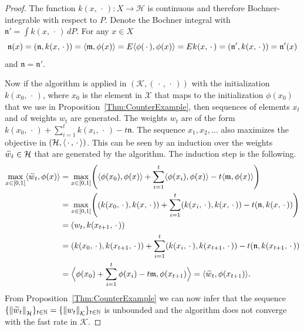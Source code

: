 \documentclass[10pt]{amsart}
\theoremstyle{definition}\newtheorem{defi}[theo]{Definition}\newtheorem{rema}[theo]{Remark}\newtheorem{exam}[theo]{Example}\newtheorem{exem}[theo]{Example}\newtheorem{nota}[theo]{Notation}
\theoremstyle{remark}
\newcommand{\bbN}{\mathbb{N}}
\newcommand{\E}{E}
\newcommand{\X}{\mathcal{X}}
\newcommand{\cH}{\mathcal{H}}
\newcommand{\clK}{\mathcal{K}}
\newcommand{\fkn}{\mathfrak{n}}
\newcommand{\mean}{\mathfrak{m}}
\providecommand{\norm}[1]{\left\lVert#1\right\rVert}
\providecommand{\inner}[2]{\left\langle #1,#2\right\rangle}
\let\oldtilde\tilde
\renewcommand*{\tilde}[1]{\mathchoice{\widetilde{#1}}{\widetilde{#1}}{\oldtilde{#1}}{\oldtilde{#1}}}
\let\originalleft\left
\let\originalright\right
\renewcommand{\left}{\mathopen{}\mathclose\bgroup\originalleft}
\renewcommand{\right}{\aftergroup\egroup\originalright}
\newcounter{setofstep}
\newcounter{step}[setofstep]
\begin{document}
\begin{proof}
The function $k(x,\,\cdot\,): X \rightarrow \cH$ is continuous and therefore Bochner-integrable with respect to $P$. Denote the Bochner integral with $\fkn' = \int k(x,\,\cdot\,) \, dP$. For any $x \in X$
\[
\fkn(x) = (\fkn, k(x,\,\cdot\,)) = \inner{\mean}{\phi(x)} = \E \inner{\phi(\,\cdot\,)}{\phi(x)} =
\E k(x,\,\cdot\,) = (\fkn',k(x,\,\cdot\,)) = \fkn'(x)
\]
and $\fkn = \fkn'$.

Now if the algorithm is applied in $(\clK,(\,\cdot\,,\,\cdot\,))$ with the initialization $k(x_0,\,\cdot\,)$, where $x_0$ is the element in $\X$ that maps to the initialization $\phi(x_0)$ that we use in Proposition~\ref{Thm:CounterExample}, then sequences of elements $x_t$ and of weights $w_t$ are generated. The weights $w_t$ are of the form $k(x_0,\,\cdot\,) + \sum_{i=1}^t k(x_i,\,\cdot\,) - t \fkn$. The sequence $x_1,x_2, \dots$ also maximizes the objective in $(\cH,\inner{\,\cdot\,}{\,\cdot\,})$. This can be seen by an induction over the weights $\tilde w_t \in \cH$ that are generated by the algorithm. The induction step is the following.
\begin{align*}
\max_{x \in [0,1]} \inner{\tilde w_t}{\phi(x)} %
&= \max_{x \in [0,1]} \left(\inner{\phi(x_0)}{\phi(x)} + \sum_{i=1}^t \inner{\phi(x_i)}{\phi(x)} - t \inner{\mean}{\phi(x)}\right) \\
&= \max_{x \in [0,1]} \left((k(x_0,\,\cdot\,),k(x,\,\cdot\,)) + \sum_{i=1}^t (k(x_i,\,\cdot\,),k(x,\,\cdot\,)) - t(\fkn,k(x,\,\cdot\,))\right)\\
&= (w_t,k(x_{t+1},\,\cdot\,)) \\
&= (k(x_0,\,\cdot\,),k(x_{t+1},\,\cdot\,)) + \sum_{i=1}^t (k(x_i,\,\cdot\,),k(x_{t+1},\,\cdot\,)) - t(\fkn,k(x_{t+1},\,\cdot\,)) \\
&= \Bigl\langle \phi(x_0) + \sum_{i=1}^t \phi(x_i) -t\mean,\phi(x_{t+1})\Bigr\rangle = \inner{\tilde w_t}{\phi(x_{t+1})}.
\end{align*}
From Proposition~\ref{Thm:CounterExample} we can now infer that the sequence $\{\norm{\tilde w_t}_\cH\}_{t \in \bbN} = \{\norm{w_t}_\clK\}_{t \in \bbN}$ is unbounded and the algorithm does not converge with the fast rate in $\clK$.
\end{proof}

\clearpage
\newpage
\footnotesize
{
\makeatletter
\renewcommand*\descriptionlabel[1]{
\normalfont\bfseries #1 }
\makeatother
\printnoidxglossary[style={centerdesc},
title={List of Notation}, toctitle={List of Notation}]
 }
\end{document}
